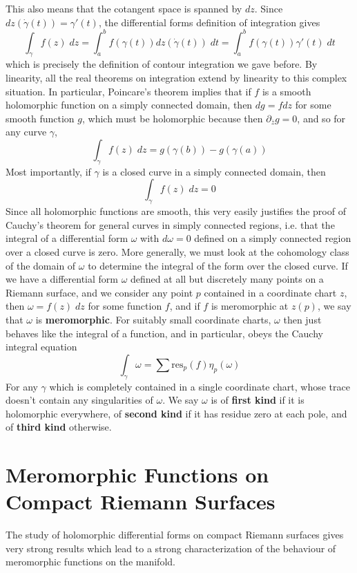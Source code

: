 This also means that the cotangent space is spanned by $dz$. Since $dz(\dot{\gamma}(t)) = \gamma'(t)$, the differential forms definition of integration gives
%
\[ \int_\gamma f(z)\; dz = \int_a^b f(\gamma(t)) dz \left(\dot{\gamma}(t) \right)\; dt = \int_a^b f(\gamma(t)) \gamma'(t)\; dt \]
%
which is precisely the definition of contour integration we gave before. By linearity, all the real theorems on integration extend by linearity to this complex situation. In particular, Poincare's theorem implies that if $f$ is a smooth holomorphic function on a simply connected domain, then $dg = f dz$ for some smooth function $g$, which must be holomorphic because then $\partial_{\overline{z}} g = 0$, and so for any curve $\gamma$,
%
\[ \int_\gamma f(z)\; dz = g(\gamma(b)) - g(\gamma(a)) \]
%
Most importantly, if $\gamma$ is a closed curve in a simply connected domain, then
%
\[ \int_\gamma f(z)\; dz = 0 \]
%
Since all holomorphic functions are smooth, this very easily justifies the proof of Cauchy's theorem for general curves in simply connected regions, i.e. that the integral of a differential form $\omega$ with $d \omega = 0$ defined on a simply connected region over a closed curve is zero. More generally, we must look at the cohomology class of the domain of $\omega$ to determine the integral of the form over the closed curve. If we have a differential form $\omega$ defined at all but discretely many points on a Riemann surface, and we consider any point $p$ contained in a coordinate chart $z$, then $\omega = f(z)\; dz$ for some function $f$, and if $f$ is meromorphic at $z(p)$, we say that $\omega$ is {\bf meromorphic}. For suitably small coordinate charts, $\omega$ then just behaves like the integral of a function, and in particular, obeys the Cauchy integral equation
%
\[ \int_\gamma \omega = \sum \text{res}_p(f) \eta_p(\omega) \]
%
For any $\gamma$ which is completely contained in a single coordinate chart, whose trace doesn't contain any singularities of $\omega$. We say $\omega$ is of {\bf first kind} if it is holomorphic everywhere, of {\bf second kind} if it has residue zero at each pole, and of {\bf third kind} otherwise.

\section{Meromorphic Functions on Compact Riemann Surfaces}

The study of holomorphic differential forms on compact Riemann surfaces gives very strong results which lead to a strong characterization of the behaviour of meromorphic functions on the manifold.

